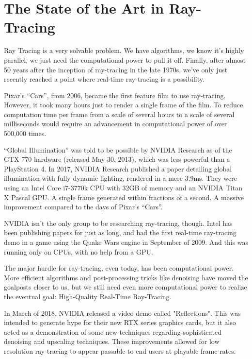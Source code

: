 \documentclass[conference]{IEEEtran}
\begin{document}
\section{The State of the Art in Ray-Tracing}

Ray Tracing is a very solvable problem. We have algorithms, we know it's highly parallel, we just need the computational power to pull it off. Finally, after almost 50 years after the inception of ray-tracing in the late 1970s, we’ve only just recently reached a point where real-time ray-tracing is a possibility.

Pixar's “Cars”, from 2006, became the first feature film to use ray-tracing\cite{b1}. However, it took many hours just to render a single frame of the film. To reduce computation time per frame from a scale of several hours to a scale of several milliseconds would require an advancement in computational power of over 500,000 times.

“Global Illumination” was told to be possible by NVIDIA Research as of the GTX 770 hardware (released May 30, 2013), which was less powerful than a PlayStation 4. In 2017, NVIDIA Research published a paper detailing global illumination with fully dynamic lighting, rendered in a mere 3.9ms\cite{b2}. They were using an Intel Core i7-3770k CPU with 32GB of memory and an NVIDIA Titan X Pascal GPU. A single frame generated within fractions of a second. A massive improvement compared to the days of Pixar’s “Cars”.

NVIDIA isn't the only group to be researching ray-tracing, though. Intel has been publishing papers for just as long, and had the first real-time ray-tracing demo in a game using the Quake Wars engine in September of 2009\cite{b3}. And this was running only on CPUs, with no help from a GPU.

The major hurdle for ray-tracing, even today, has been computational power. More efficient algorithms and post-processing tricks like denoising have moved the goalposts closer to us, but we still need even more computational power to realize the eventual goal: High-Quality Real-Time Ray-Tracing.

In March of 2018, NVIDIA released a video demo called "Reflections"\cite{b4}. This was intended to generate hype for their new RTX series graphics cards, but it also acted as a demonstration of some new techniques regarding sophisticated denoising and upscaling techniques. These improvements allowed for low resolution ray-tracing to appear passable to end users at playable frame-rates. 
\end{document}
